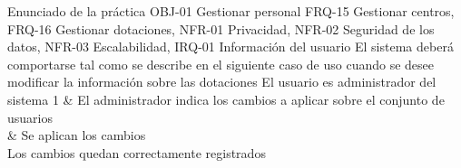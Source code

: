 {\reportauthors}
{Enunciado de la práctica}
{OBJ-01 Gestionar personal}
{FRQ-15 Gestionar centros, FRQ-16 Gestionar dotaciones, NFR-01 Privacidad, NFR-02 Seguridad de los datos, NFR-03 Escalabilidad, IRQ-01 Información del usuario}
{El sistema deberá comportarse tal como se describe en el siguiente caso de uso cuando se desee modificar la información sobre las dotaciones}
{El usuario es administrador del sistema}
{
1 & El administrador indica los cambios a aplicar sobre el conjunto de usuarios \\  & Se aplican los cambios \\
}
{Los cambios quedan correctamente registrados}
{}

